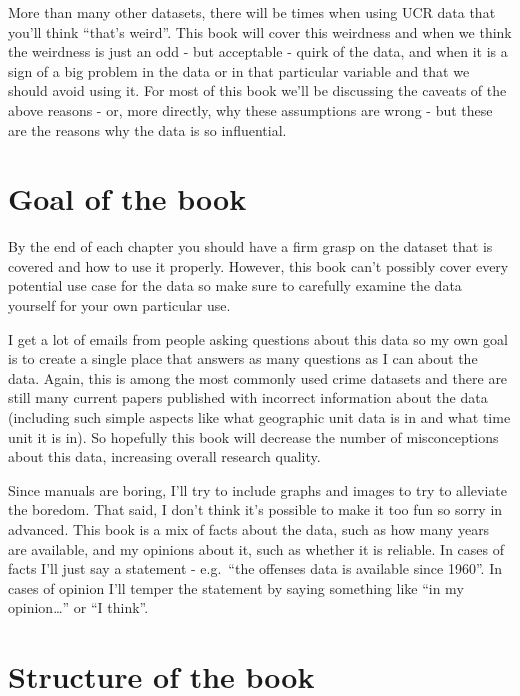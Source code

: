 \documentclass[
  12pt,
  openany]{book}
\begin{document}
More than many other datasets, there will be times when using UCR data that you'll think ``that's weird''. This book will cover this weirdness and when we think the weirdness is just an odd - but acceptable - quirk of the data, and when it is a sign of a big problem in the data or in that particular variable and that we should avoid using it. For most of this book we'll be discussing the caveats of the above reasons - or, more directly, why these assumptions are wrong - but these are the reasons why the data is so influential.

\section{Goal of the book}\label{goal-of-the-book}

By the end of each chapter you should have a firm grasp on the dataset that is covered and how to use it properly. However, this book can't possibly cover every potential use case for the data so make sure to carefully examine the data yourself for your own particular use.

I get a lot of emails from people asking questions about this data so my own goal is to create a single place that answers as many questions as I can about the data. Again, this is among the most commonly used crime datasets and there are still many current papers published with incorrect information about the data (including such simple aspects like what geographic unit data is in and what time unit it is in). So hopefully this book will decrease the number of misconceptions about this data, increasing overall research quality.

Since manuals are boring, I'll try to include graphs and images to try to alleviate the boredom. That said, I don't think it's possible to make it too fun so sorry in advanced. This book is a mix of facts about the data, such as how many years are available, and my opinions about it, such as whether it is reliable. In cases of facts I'll just say a statement - e.g.~``the offenses data is available since 1960''. In cases of opinion I'll temper the statement by saying something like ``in my opinion\ldots{}'' or ``I think''.

\section{Structure of the book}\label{structure-of-the-book}
\end{document}
